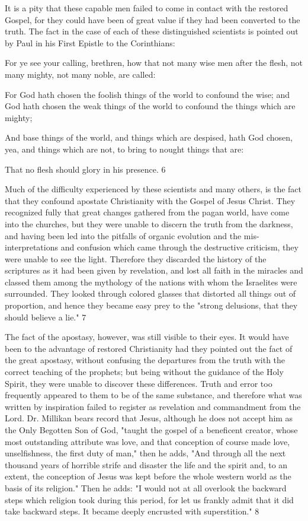It is a pity that these capable men failed to come in contact with the restored Gospel, for they
could have been of great value if they had been converted to the truth. The fact in the case of
each of these distinguished scientists is pointed out by Paul in his First Epistle to the
Corinthians:

For ye see your calling, brethren, how that not many wise men after the flesh, not many
mighty, not many noble, are called:

For God hath chosen the foolish things of the world to confound the wise; and God hath
chosen the weak things of the world to confound the things which are mighty;

And base things of the world, and things which are despised, hath God chosen, yea, and
things which are not, to bring to nought things that are:

That no flesh should glory in his presence. 6

Much of the difficulty experienced by these scientists and many others, is the fact that they
confound apostate Christianity with the Gospel of Jesus Christ. They recognized fully that
great changes gathered from the pagan world, have come into the churches, but they were
unable to discern the truth from the darkness, and having been led into the pitfalls of organic
evolution and the mis-interpretations and confusion which came through the destructive
criticism, they were unable to see the light. Therefore they discarded the history of the
scriptures as it had been given by revelation, and lost all faith in the miracles and classed
them among the mythology of the nations with whom the Israelites were surrounded. They
looked through colored glasses that distorted all things out of proportion, and hence they
became easy prey to the "strong delusions, that they should believe a lie." 7

The fact of the apostasy, however, was still visible to their eyes. It would have been to the
advantage of restored Christianity had they pointed out the fact of the great apostasy, without
confusing the departures from the truth with the correct teaching of the prophets; but being
without the guidance of the Holy Spirit, they were unable to discover these differences. Truth
and error too frequently appeared to them to be of the same substance, and therefore what
was written by inspiration failed to register as revelation and commandment from the Lord.
Dr. Millikan bears record that Jesus, although he does not accept him as the Only Begotten
Son of God, "taught the gospel of a beneficent creator, whose most outstanding attribute was
love, and that conception of course made love, unselfishness, the first duty of man," then he
adds, "And through all the next thousand years of horrible strife and disaster the life and the
spirit and, to an extent, the conception of Jesus was kept before the whole western world as
the basis of its religion." Then he adds: "I would not at all overlook the backward steps which
religion took during this period, for let us frankly admit that it did take backward steps. It
became deeply encrusted with superstition." 8

